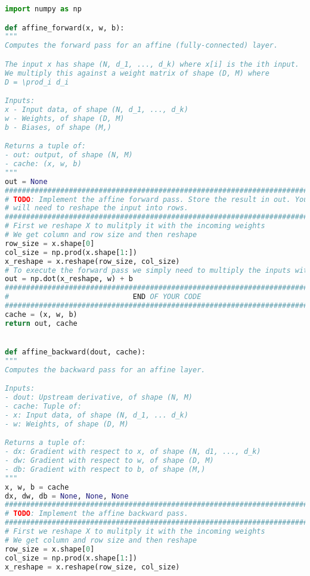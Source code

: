 \begin{lstlisting}[language=Python, label=lst:layers.py, caption={layers.py}, basicstyle=\tiny]
import numpy as np

def affine_forward(x, w, b):
"""
Computes the forward pass for an affine (fully-connected) layer.

The input x has shape (N, d_1, ..., d_k) where x[i] is the ith input.
We multiply this against a weight matrix of shape (D, M) where
D = \prod_i d_i

Inputs:
x - Input data, of shape (N, d_1, ..., d_k)
w - Weights, of shape (D, M)
b - Biases, of shape (M,)

Returns a tuple of:
- out: output, of shape (N, M)
- cache: (x, w, b)
"""
out = None
#############################################################################
# TODO: Implement the affine forward pass. Store the result in out. You     #
# will need to reshape the input into rows.                                 #
#############################################################################
# First we reshape X to mulitply it with the incoming weights
# We get column and row size and then reshape
row_size = x.shape[0]
col_size = np.prod(x.shape[1:])
x_reshape = x.reshape(row_size, col_size)
# To execute the forward pass we simply need to multiply the inputs with the weights
out = np.dot(x_reshape, w) + b
#############################################################################
#                             END OF YOUR CODE                              #
#############################################################################
cache = (x, w, b)
return out, cache


def affine_backward(dout, cache):
"""
Computes the backward pass for an affine layer.

Inputs:
- dout: Upstream derivative, of shape (N, M)
- cache: Tuple of:
- x: Input data, of shape (N, d_1, ... d_k)
- w: Weights, of shape (D, M)

Returns a tuple of:
- dx: Gradient with respect to x, of shape (N, d1, ..., d_k)
- dw: Gradient with respect to w, of shape (D, M)
- db: Gradient with respect to b, of shape (M,)
"""
x, w, b = cache
dx, dw, db = None, None, None
#############################################################################
# TODO: Implement the affine backward pass.                                 #
#############################################################################
# First we reshape X to mulitply it with the incoming weights
# We get column and row size and then reshape
row_size = x.shape[0]
col_size = np.prod(x.shape[1:])
x_reshape = x.reshape(row_size, col_size)


\end{lstlisting}
